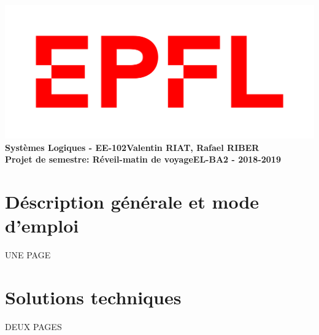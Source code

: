 \documentclass[a4paper, 11pt]{article}
\begin{document}
\noindent \includegraphics[scale=0.2]{figures/logo.png}\\
\large \textbf{Systèmes Logiques - EE-102}\hfill \textbf{Valentin RIAT, Rafael RIBER}\\
 \hfill \large \textbf{Projet de semestre: Réveil-matin de voyage}\hfill \textbf{EL-BA2 - 2018-2019}

\section{Déscription générale et mode d'emploi}
UNE PAGE

\section{Solutions techniques}
DEUX PAGES
\end{document}
